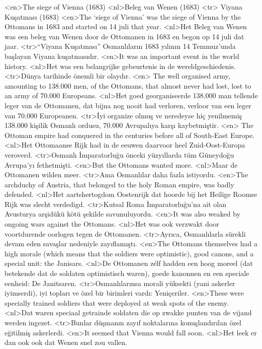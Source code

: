 <en>The siege of Vienna (1683) 
<nl>Beleg van Wenen (1683)  
<tr> Viyana Kuşatması (1683)
<en>The `siege of Vienna' was the siege of Vienna by the Ottomans in 1683 and started on 14 juli  that year.   
<nl>Het Beleg van Wenen was een beleg van Wenen door de Ottomanen in 1683 en begon op 14 juli dat jaar.  
<tr>``Viyana Kuşatması'' Osmanlıların 1683 yılının 14 Temmuz'unda başlayan Viyana kuşatmasıdır.
<en>It was an important event in the world history. 
<nl>Het was een belangrijke gebeurtenis in de wereldgeschiedenis.  
<tr>Dünya tarihinde önemli bir olaydır.
<en> The well organised army, amounting to  138.000 men, of the Ottomans, that almost never  had lost, lost to an army of 70.000 Europeans. 
<nl>Het goed georganiseerde 138.000 man tellende leger van de Ottomanen, dat bijna nog nooit had verloren, verloor van een leger van 70.000 Europeanen. 
<tr>İyi organize olmuş ve neredeyse hiç yenilmemiş 138.000 kişilik Osmanlı ordusu, 70.000 Avrupalıya karşı kaybetmiştir.
<en> The Ottoman empire had conquered in the centuries before all of South-East Europe.  
<nl>Het Ottomaanse Rijk had in de eeuwen daarvoor heel Zuid-Oost-Europa veroverd. 
<tr>Osmanlı İmparatorluğu önceki yüzyıllarda tüm Güneydoğu Avrupa'yı fethetmişti.  
<en>But the Ottomans wanted more.
<nl>Maar de Ottomanen wilden meer. 
<tr>Ama Osmanlılar daha fazla istiyordu.
<en>The archduchy of Austria, that belonged to the holy Roman empire, was badly defended. 
<nl>Het aartshertogdom Oostenrijk dat hoorde bij het Heilige Roomse Rijk was slecht verdedigd. 
<tr>Kutsal Roma İmparatorluğu'na ait olan Avusturya arşidükü kötü şekilde savunuluyordu. 
<en>It was also weaked by ongoing wars against the Ottomans. 
<nl>Het was  ook verzwakt door voortdurende oorlogen tegen de Ottomanen. 
<tr>Ayrıca, Osmanlılarla sürekli devam eden savaşlar nedeniyle zayıflamıştı.
<en>The Ottomans themselves had a high morale (which means that the soldiers were optimistic), good canons, and a special unit: the Janisars.
<nl>De Ottomanen zélf hadden een hoog moreel (dat betekende dat de soldaten optimistisch waren), goede kanonnen en een speciale eenheid: De Janitsaren. 
<tr>Osmanlılarınsa morali yüksekti (yani askerler iyimserdi), iyi topları ve özel bir birimleri vardı: Yeniçeriler.  
<en>These were specially trained soldiers that were deployed at weak spots of the enemy.
<nl>Dat waren speciaal getrainde soldaten die op zwakke punten van de vijand werden ingezet. 
<tr>Bunlar düşmanın zayıf noktalarına konuşlandırılan özel eğitilmiş askerlerdi. 
<en>It seemed that Vienna would fall soon.
<nl>Het leek er dan ook ook dat Wenen snel zou vallen. 
